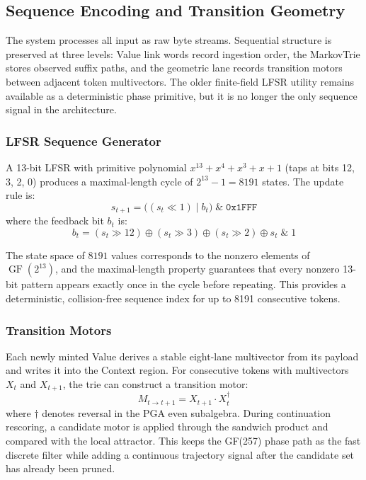 \subsection{Sequence Encoding and Transition Geometry}
\label{sec:topological_sequencing}

The system processes all input as raw byte streams.  Sequential
structure is preserved at three levels: Value link words record
ingestion order, the MarkovTrie stores observed suffix paths, and the
geometric lane records transition motors between adjacent token
multivectors.  The older finite-field LFSR utility remains available as
a deterministic phase primitive, but it is no longer the only sequence
signal in the architecture.

\subsubsection{LFSR Sequence Generator}

A 13-bit LFSR with primitive polynomial $x^{13} + x^4 + x^3 + x + 1$
(taps at bits 12, 3, 2, 0) produces a maximal-length cycle of
$2^{13} - 1 = 8191$ states.  The update rule is:
\begin{equation}
  s_{t+1} = \bigl((s_t \ll 1) \mathbin{|} b_t\bigr) \;\mathbin{\&}\; \texttt{0x1FFF}
  \label{eq:lfsr_step}
\end{equation}
where the feedback bit $b_t$ is:
\begin{equation}
  b_t = (s_t \gg 12) \oplus (s_t \gg 3) \oplus (s_t \gg 2) \oplus s_t
        \;\mathbin{\&}\; 1
  \label{eq:lfsr_feedback}
\end{equation}

The state space of $8191$ values corresponds to the nonzero elements of
$\operatorname{GF}(2^{13})$, and the maximal-length property guarantees
that every nonzero 13-bit pattern appears exactly once in the cycle
before repeating.  This provides a deterministic, collision-free
sequence index for up to 8191 consecutive tokens.

\subsubsection{Transition Motors}

Each newly minted Value derives a stable eight-lane multivector from its
payload and writes it into the Context region.  For consecutive tokens
with multivectors $X_t$ and $X_{t+1}$, the trie can construct a
transition motor:
\begin{equation}
  M_{t \rightarrow t+1} = X_{t+1} \cdot X_t^{\dagger}
  \label{eq:transition_motor}
\end{equation}
where $\dagger$ denotes reversal in the PGA even subalgebra.  During
continuation rescoring, a candidate motor is applied through the
sandwich product and compared with the local attractor.  This keeps the
GF(257) phase path as the fast discrete filter while adding a continuous
trajectory signal after the candidate set has already been pruned.

